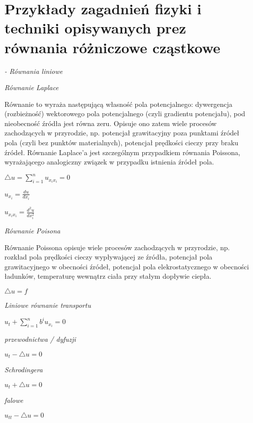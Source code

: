 \section{Przykłady zagadnień fizyki i techniki opisywanych prez równania różniczowe cząstkowe}


\textit{- Równania liniowe}


\textit{Równanie Laplace}


Równanie to wyraża następującą własność pola potencjalnego: dywergencja (rozbieżność) wektorowego pola potencjalnego (czyli gradientu potencjału), pod nieobecność źródła jest równa zeru. Opisuje ono zatem wiele procesów zachodzących w przyrodzie, np. potencjał grawitacyjny poza punktami źródeł pola (czyli bez punktów materialnych), potencjał prędkości cieczy przy braku źródeł. Równanie Laplace’a jest szczególnym przypadkiem równania Poissona, wyrażającego analogiczny związek w przypadku istnienia źródeł pola.


$ \bigtriangleup u = \sum_{i=1}^{n} u_{x_ix_i} =0$

$ u_{x_i} = \frac{du}{dx_i}$

$ u_{x_i x_i} = \frac{d^2u}{dx_i^2}$

\textit{Równanie Poisona}



Równanie Poissona opisuje wiele procesów zachodzących w przyrodzie, np. rozkład pola prędkości cieczy wypływającej ze źródła, potencjał pola grawitacyjnego w obecności źródeł, potencjał pola elekrostatycznego w obecności ładunków, temperaturę wewnątrz ciała przy stałym dopływie ciepła.

$ \bigtriangleup u =f$

\textit{Liniowe równanie transportu}

$u_t + \sum_{i=1}^{n}b^iu_{x_i} = 0$

\textit{przewodnictwa / dyfuzji}

$u_t - \bigtriangleup u = 0$

\textit{Schrodingera}

$u_t + \bigtriangleup u = 0$

\textit{falowe}

$u_{tt} - \bigtriangleup u = 0 $
